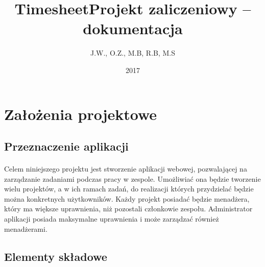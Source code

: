 \documentclass[a4paper, 12pt, oneside]{article}
\title{\textbf{Timesheet}\linebreak Projekt zaliczeniowy -- dokumentacja}
\author{J.W., O.Z., M.B, R.B, M.S}
\date{2017}
\begin{document}

\maketitle
\thispagestyle{empty}

\newpage


\tableofcontents
\newpage


\section{Założenia projektowe}
	\subsection{Przeznaczenie aplikacji}
		\paragraph{}Celem niniejszego projektu jest stworzenie aplikacji webowej, pozwalającej na zarządzanie zadaniami podczas pracy w zespole. Umożliwiać ona będzie tworzenie wielu projektów, a w ich ramach zadań, do realizacji których przydzielać będzie można konkretnych użytkowników. Każdy projekt posiadać będzie menadżera, który ma większe uprawnienia, niż pozostali członkowie zespołu. Administrator aplikacji posiada maksymalne uprawnienia i może zarządzać również menadżerami.
	\subsection{Elementy składowe}
\end{document}
